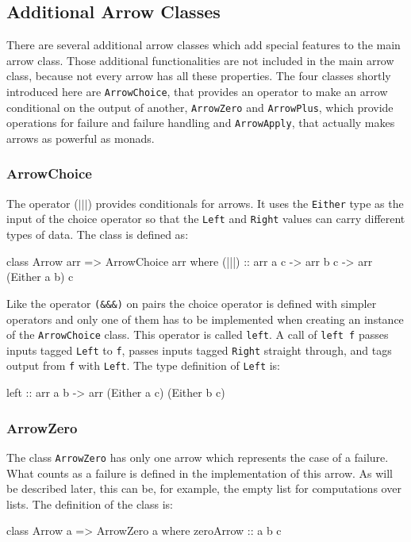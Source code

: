 \documentclass[11pt,a4paper,headsepline, bibtotoc]{scrreprt}
\begin{document}
\subsection{Additional Arrow Classes}
There are several additional arrow classes which add special features to the main arrow class. Those additional functionalities are not included in the main arrow class, because not every arrow has all these properties. The four classes shortly introduced here are {\tt ArrowChoice}, that provides an operator to make an arrow conditional on the output of another, \texttt{ArrowZero} and \texttt{ArrowPlus}, which provide operations for failure and failure handling and \texttt{ArrowApply}, that actually makes arrows as powerful as monads.

\subsubsection{ArrowChoice}
The operator ($|$$|$$|$) provides conditionals for arrows. It uses the \texttt{Either} type as the input of the choice operator so that the \texttt{Left} and \texttt{Right} values can carry different types of data. The class is defined as:
\begin{code}
class Arrow arr => ArrowChoice arr where
  (|||) :: arr a c -> arr b c -> arr (Either a b) c
\end{code}
Like the operator {\tt (\&\&\&)} on pairs the choice operator is defined with simpler operators and only one of them has to be implemented when creating an instance of the \texttt{ArrowChoice} class. This operator is called \texttt{left}. A call of \texttt{left f} passes inputs tagged \texttt{Left} to \texttt{f}, passes inputs tagged \texttt{Right} straight through, and tags output from \texttt{f} with \texttt{Left}. The type definition of \texttt{Left} is:
\begin{code}
left :: arr a b -> arr (Either a c) (Either b c)
\end{code}

\subsubsection{ArrowZero}
The class \texttt{ArrowZero} has only one arrow which represents the case of a failure. What counts as a failure is defined in the implementation of this arrow. As will be described later, this can be, for example, the empty list for computations over lists. The definition of the class is:
\begin{code}
class Arrow a => ArrowZero a where
  zeroArrow :: a b c
\end{code}
\end{document}
